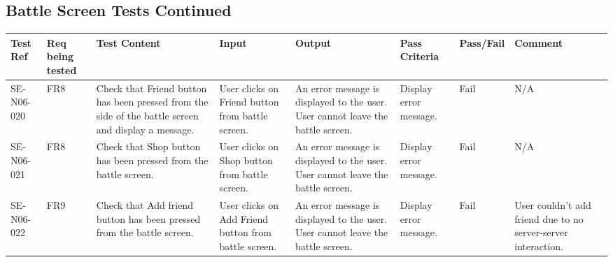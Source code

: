 \documentclass[titlepage]{article}
\begin{document}
{\subsection{Battle Screen Tests Continued}
\begin{sideways}
\begin{tabular}{|p{1cm}|p{1cm}|p{3cm}|p{3cm}|p{2cm}|p{3cm}|p{2cm}|p{2cm}|}
\hline
Test Ref & Req being tested & Test Content & Input & Output & Pass Criteria & Pass/Fail & Comment \\ 
\hline
SE-N06-020 & FR8 & Check that Friend button has been pressed from the side of the battle screen and  display a message. & User clicks on Friend button from battle screen. & An error message is displayed to the user.  User cannot leave the battle screen. & Display error message. & Fail & N/A \\
\hline
SE-N06-021 & FR8 & Check that Shop button has been pressed from the battle screen. & User clicks on Shop button from battle screen. & An error message is displayed to the user.  User cannot leave the battle screen. & Display error message. & Fail & N/A\\
\hline
SE-N06-022 & FR9 & Check that Add friend button has been pressed from the battle screen. & User clicks on Add Friend button from battle screen. & An error message is displayed to the user.  User cannot leave the battle screen. & Display error message. & Fail & User couldn't add friend due to no server-server interaction.\\
\hline
\end{tabular}
\end{sideways}
\newpage
}
\end{document}
